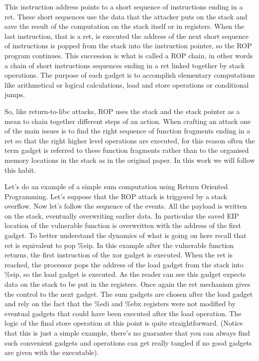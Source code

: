 \documentclass[Lau,binding=0.6cm]{sapthesis}
\begin{document}
This instruction address points to a short sequence of instructions ending in a ret. These short sequences use the data that the attacker puts on the stack and save the result of the computation on the stack itself or in registers. When the last instruction, that is a ret, is executed the address of the next short sequence of instructions is popped from the stack into the instruction pointer, so the ROP program continues. 
This succession is what is called a ROP chain, in other words a chain of short instructions sequences ending in a ret linked together by stack operations.
The purpose of each gadget is to accomplish elementary computations like arithmetical or logical calculations, load and store operations or conditional jumps.

So, like return-to-libc attacks, ROP uses the stack and the stack pointer as a mean to chain together different steps of an action.
When crafting an attack one of the main issues is to find the right sequence of function fragments ending in a ret so that the right higher level operations are executed, for this reason often the term gadget is referred to these function fragments rather than to the organised memory locations in the stack as in the original paper. In this work we will follow this habit.

Let’s do an example of a simple sum computation using Return Oriented Programming.
Let’s suppose that the ROP attack is triggered by a stack overflow. Now let’s follow the sequence of the events. All the payload is written on the stack, eventually overwriting earlier data. In particular the saved EIP location of the vulnerable function is overwritten with the address of the first gadget. 
To better understand the dynamics of what is going on here recall that ret is equivalent to pop \%eip. In this example after the vulnerable function returns, the first instruction of the xor gadget is executed. When the ret is reached, the processor pops the address of the load gadget from the stack into \%eip, so the load gadget is executed.
As the reader can see this gadget expects data on the stack to be put in the registers. Once again the ret mechanism gives the control to the next gadget. The sum gadgets are chosen after the load gadget and rely on the fact that the \%edi and \%ebx registers were not modified by eventual gadgets that could have been executed after the load operation. The logic of the final store operation at this point is quite straightforward. (Notice that this is just a simple example, there’s no guarantee that you can always find such convenient gadgets and operations can get really tangled if no good gadgets are given with the executable).
\end{document}
